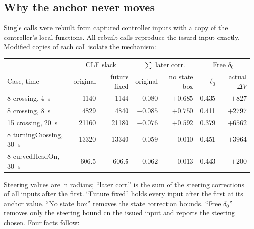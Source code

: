 \documentclass[11pt]{article}
\begin{document}
\subsection{Why the anchor never moves}
Single calls were rebuilt from captured controller inputs with a copy of the
controller's local functions. All rebuilt calls reproduce the issued input
exactly. Modified copies of each call isolate the mechanism:
\begin{center}\footnotesize
\begin{tabular}{lrrrrrr}
\toprule
 & \multicolumn{2}{c}{CLF slack} & \multicolumn{2}{c}{$\sum$ later corr.} & \multicolumn{2}{c}{Free $\delta_0$}\\
Case, time & original & future fixed & original & no state box & $\delta_0$ & actual $\Delta V$\\
\midrule
8 crossing, 4~s & 1140 & 1144 & $-0.080$ & $+0.685$ & 0.435 & $+827$\\
8 crossing, 8~s & 4829 & 4840 & $-0.085$ & $+0.750$ & 0.411 & $+2797$\\
15 crossing, 20~s & 21160 & 21180 & $-0.076$ & $+0.592$ & 0.379 & $+6562$\\
8 turningCrossing, 30~s & 13320 & 13340 & $-0.059$ & $-0.010$ & 0.451 & $+3964$\\
8 curvedHeadOn, 30~s & 606.5 & 606.6 & $-0.062$ & $-0.013$ & 0.443 & $+200$\\
\bottomrule
\end{tabular}\end{center}
Steering values are in radians; ``later corr.'' is the sum of the steering
corrections of all inputs after the first. ``Future fixed'' holds every input
after the first at its anchor value. ``No state box'' removes the state
correction bounds. ``Free $\delta_0$'' removes only the steering bound on the
issued input and reports the steering chosen.
Four facts follow:
\end{document}
